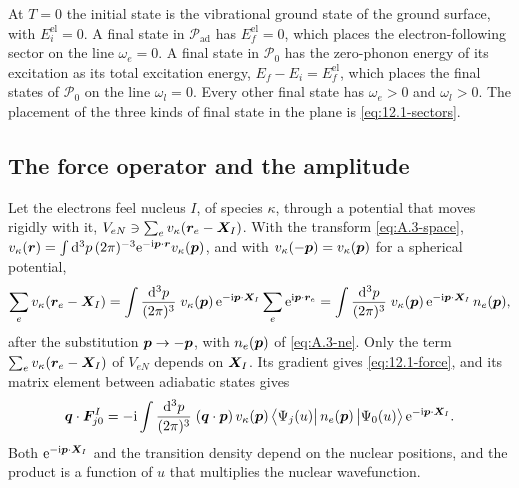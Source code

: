At $T = 0$ the initial state is the vibrational ground state of the ground surface, with $E^{\mathrm{el}}_i = 0$. A final state in $\mathcal{P}_{\mathrm{ad}}$ has $E^{\mathrm{el}}_f = 0$, which places the electron-following sector on the line $\omega_e = 0$. A final state in $\mathcal{P}_0$ has the zero-phonon energy of its excitation as its total excitation energy, $E_f - E_i = E^{\mathrm{el}}_f$, which places the final states of $\mathcal{P}_0$ on the line $\omega_l = 0$. Every other final state has $\omega_e > 0$ and $\omega_l > 0$. The placement of the three kinds of final state in the plane is \cref{eq:12.1-sectors}.

\subsection{The force operator and the amplitude}\label{app:D.33-amp}

Let the electrons feel nucleus $I$, of species $\kappa$, through a potential that moves rigidly with it, $V_{eN} \ni \sum_ev_\kappa(\bm{r}_e - \bm{X}_I)$. With the transform \cref{eq:A.3-space}, $v_\kappa(\bm{r}) = \int\mathrm{d}^3p\,(2\pi)^{-3}\mathrm{e}^{-\mathrm{i}\bm{p}\cdot\bm{r}}v_\kappa(\bm{p})$, and with $v_\kappa(-\bm{p}) = v_\kappa(\bm{p})$ for a spherical potential,
\begin{equation*}
  \sum_ev_\kappa(\bm{r}_e - \bm{X}_I) = \int\frac{\mathrm{d}^3p}{(2\pi)^3}\;v_\kappa(\bm{p})\,\mathrm{e}^{-\mathrm{i}\bm{p}\cdot\bm{X}_I}\sum_e\mathrm{e}^{\mathrm{i}\bm{p}\cdot\bm{r}_e}
  = \int\frac{\mathrm{d}^3p}{(2\pi)^3}\;v_\kappa(\bm{p})\,\mathrm{e}^{-\mathrm{i}\bm{p}\cdot\bm{X}_I}\,n_e(\bm{p}) ,
\end{equation*}
after the substitution $\bm{p} \to -\bm{p}$, with $n_e(\bm{p})$ of \cref{eq:A.3-ne}. Only the term $\sum_ev_\kappa(\bm{r}_e - \bm{X}_I)$ of $V_{eN}$ depends on $\bm{X}_I$. Its gradient gives \cref{eq:12.1-force}, and its matrix element between adiabatic states gives
\begin{equation}
  \bm{q}\cdot\bm{F}^I_{j0} = -\mathrm{i}\int\frac{\mathrm{d}^3p}{(2\pi)^3}\;(\bm{q}\cdot\bm{p})\,v_\kappa(\bm{p})\,\bigl\langle\Psi_j(u)\big|\,n_e(\bm{p})\,\big|\Psi_0(u)\bigr\rangle\,\mathrm{e}^{-\mathrm{i}\bm{p}\cdot\bm{X}_I} .
  \label{eq:D.33-F}
\end{equation}
Both $\mathrm{e}^{-\mathrm{i}\bm{p}\cdot\bm{X}_I}$ and the transition density depend on the nuclear positions, and the product is a function of $u$ that multiplies the nuclear wavefunction.

